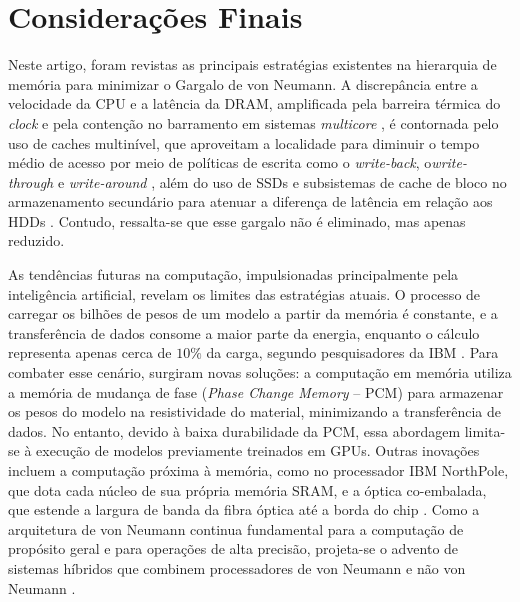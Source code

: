 \documentclass[12pt]{article}
\begin{document}
\section{Considerações Finais} \label{sec:conclusao}

Neste artigo, foram revistas as principais estratégias existentes na hierarquia de memória para minimizar o Gargalo de von Neumann. A discrepância entre a velocidade da CPU e a latência da DRAM, amplificada pela barreira térmica do \textit{clock} e pela contenção no barramento em sistemas \textit{multicore} \cite{ferreira2015, tanenbaum2013}, é contornada pelo uso de caches multinível, que aproveitam a localidade para diminuir o tempo médio de acesso por meio de políticas de escrita como o \textit{write-back}, o\textit{write-through} e \textit{write-around} \cite{stallings2010, ferreira2015}, além do uso de SSDs e subsistemas de cache de bloco no armazenamento secundário para atenuar a diferença de latência em relação aos HDDs \cite{santos2015}. Contudo, ressalta-se que esse gargalo não é eliminado, mas apenas reduzido.

As tendências futuras na computação, impulsionadas principalmente pela inteligência artificial, revelam os limites das estratégias atuais. O processo de carregar os bilhões de pesos de um modelo a partir da memória é constante, e a transferência de dados consome a maior parte da energia, enquanto o cálculo representa apenas cerca de $10\%$ da carga, segundo pesquisadores da IBM \cite{hess2025}. Para combater esse cenário, surgiram novas soluções: a computação em memória utiliza a memória de mudança de fase (\textit{Phase Change Memory} -- PCM) para armazenar os pesos do modelo na resistividade do material, minimizando a transferência de dados. No entanto, devido à baixa durabilidade da PCM, essa abordagem limita-se à execução de modelos previamente treinados em GPUs. Outras inovações incluem a computação próxima à memória, como no processador IBM NorthPole, que dota cada núcleo de sua própria memória SRAM, e a óptica co-embalada, que estende a largura de banda da fibra óptica até a borda do chip \cite{hess2025}. Como a arquitetura de von Neumann continua fundamental para a computação de propósito geral e para operações de alta precisão, projeta-se o advento de sistemas híbridos que combinem processadores de von Neumann e não von Neumann \cite{hess2025}. 



\end{document}
